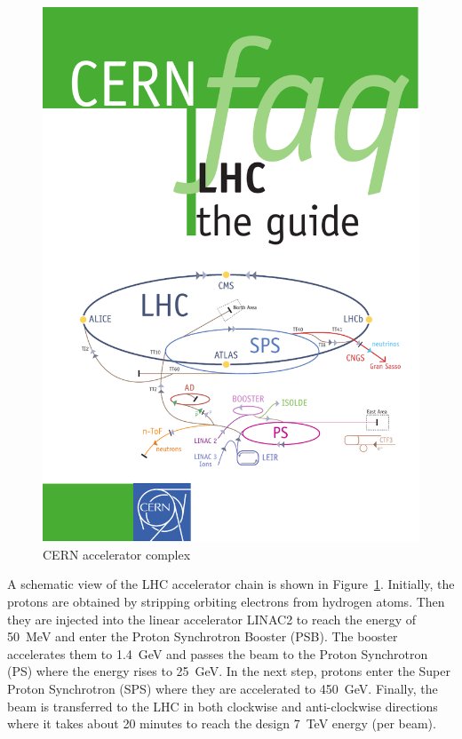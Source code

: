 \begin{figure}[!htbp]
  \centering
  \leavevmode
  \includegraphics[width=\columnwidth]{LHC}
  \caption{CERN accelerator complex}
  \label{fig:LHC}
\end{figure}
\newpage
A schematic view of the LHC accelerator chain is shown in Figure~\ref{fig:LHC}. Initially, the protons are obtained by
stripping orbiting electrons from hydrogen atoms. Then they are injected into the linear accelerator LINAC2 to reach the
energy of \SI{50}{\MeV} and enter the Proton Synchrotron Booster (PSB). The booster accelerates them to \SI{1.4}{\GeV}
and passes the beam to the Proton Synchrotron (PS) where the energy rises to \SI{25}{\GeV}. In the next step, protons
enter the Super Proton Synchrotron (SPS) where they are accelerated to \SI{450}{\GeV}. Finally, the beam is transferred
to the LHC in both clockwise and anti-clockwise directions where it takes about 20 minutes to reach the design
\SI{7}{\TeV} energy (per beam).

